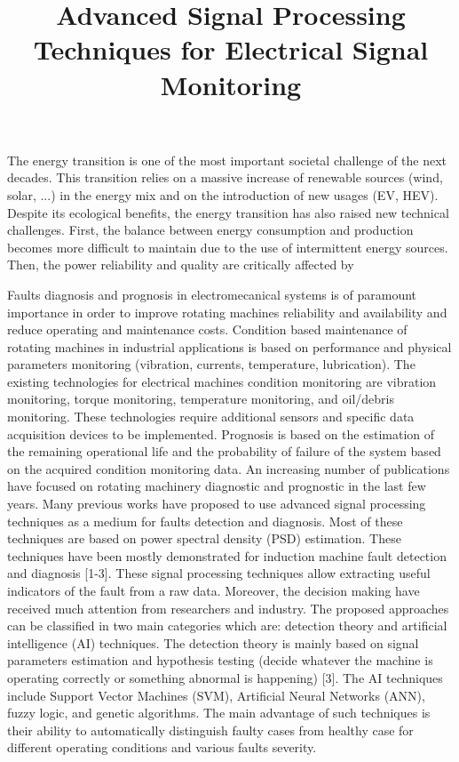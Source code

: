 \documentclass{article}
\begin{document}
\title{Advanced Signal Processing Techniques for Electrical Signal Monitoring}
   
 \maketitle  
 
The energy transition is one of the most important societal challenge of the next decades. This transition relies on a massive increase of renewable sources (wind, solar, ...) in the energy mix and on the introduction of new usages (EV, HEV). Despite its ecological benefits, the energy transition has also raised new technical challenges. First, the balance between energy consumption and production becomes more difficult to maintain due to the use of intermittent energy sources. Then, the power reliability and quality are critically affected by 



Faults diagnosis and prognosis in electromecanical systems is of paramount importance in order to improve rotating machines reliability and availability and reduce operating and maintenance costs. Condition based maintenance of rotating machines in industrial applications is based on performance and physical parameters monitoring (vibration, currents, temperature, lubrication). The existing technologies for electrical machines condition monitoring are vibration monitoring, torque monitoring, temperature monitoring, and oil/debris monitoring. These technologies require additional sensors and specific data acquisition devices to be implemented. Prognosis is based on the estimation of the remaining operational life and the probability of failure of the system based on the acquired condition monitoring data. An increasing number of publications have focused on rotating machinery diagnostic and prognostic in the last few years. Many previous works have proposed to use advanced signal processing techniques as a medium for faults detection and diagnosis. Most of these techniques are based on power spectral density (PSD) estimation.  These techniques have been mostly demonstrated for induction machine fault detection and diagnosis [1-3]. These signal processing techniques allow extracting useful indicators of the fault from a raw data. Moreover, the decision making have received much attention from researchers and industry. The proposed approaches can be classified in two main categories which are: detection theory and artificial intelligence (AI) techniques. The detection theory is mainly based on signal parameters estimation and hypothesis testing (decide whatever the machine is operating correctly or something abnormal is happening) [3]. The AI techniques include Support Vector Machines (SVM), Artificial Neural Networks (ANN), fuzzy logic, and genetic algorithms. The main advantage of such techniques is their ability to automatically distinguish faulty cases from healthy case for different operating conditions and various faults severity. 
\end{document}
